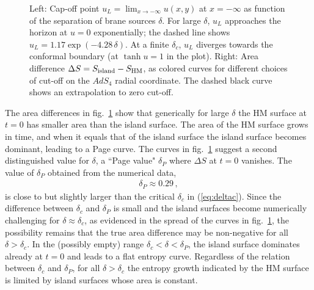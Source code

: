 \documentclass[aps,prd,11pt,notitlepage,longbibliography,nofootinbib,tightenlines,preprintnumbers]{revtex4-1}
\begin{document}
\begin{figure}
	\hskip 10mm
	\caption{Left: Cap-off point $u_L=\lim_{x\rightarrow -\infty} u(x,y)$ at $x=-\infty$ as function of the separation of brane sources $\delta$. 
		For large $\delta$, $u_L$ approaches the horizon at $u=0$ exponentially; the dashed line shows $u_L=1.17\exp(-4.28\,\delta)$. 
		At a finite $\delta_c$,  $u_L$ diverges towards the conformal boundary (at $\tanh u=1$ in the plot).
		Right: Area difference $\Delta S=S_{\rm island}-S_{\rm HM}$, as colored curves for different choices of cut-off on the $AdS_4$ radial coordinate. The dashed black curve shows an extrapolation to zero cut-off.
		\label{fig:LRcrit1}}
\end{figure}


The area differences in fig.~\ref{fig:LRcrit1} show that generically for large $\delta$ the HM surface at $t=0$ has smaller area than the island surface. The area of the HM surface grows in time, and when it equals that of the island surface the island surface becomes dominant, leading to a Page curve.
The curves in fig.~\ref{fig:LRcrit1} suggest a second distinguished value for $\delta$, 
a ``Page value" $\delta_P$ where $\Delta S$ at $t=0$ vanishes. 
The value of $\delta_P$ obtained from the numerical data,
\begin{align}
	\delta_P\approx 0.29\,,
\end{align}   
is close to but slightly larger than the critical $\delta_c$ in (\ref{eq:deltac}).
Since the difference between $\delta_c$ and $\delta_P$ is small and the island surfaces become numerically challenging for $\delta\approx \delta_c$, as evidenced in the spread of the curves in fig.~\ref{fig:LRcrit1},
the possibility remains that the true area difference may be non-negative for all $\delta>\delta_c$.
In the (possibly empty) range $\delta_c<\delta<\delta_P$, the island surface dominates already at $t=0$ and leads to a flat entropy curve.
%
Regardless of the relation between $\delta_c$ and $\delta_P$, for all $\delta>\delta_c$ the entropy growth indicated by the HM surface is limited by island surfaces whose area is constant.
\end{document}
